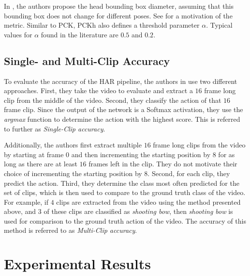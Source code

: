 In \cite{andriluka_2d_2014}, the authors propose the head bounding box diameter, assuming that this bounding box does not change for different poses.
See  for a motivation of the metric.
Similar to PCK, PCKh also defines a threshold parameter $\alpha$.
Typical values for $\alpha$ found in the literature are $0.5$ and $0.2$.

\subsection{Single- and Multi-Clip Accuracy}
To evaluate the accuracy of the HAR pipeline, the authors in \cite{luvizon_2d/3d_2018} use two different approaches.
First, they take the video to evaluate and extract a $16$ frame long clip from the middle of the video.
Second, they classify the action of that $16$ frame clip.
Since the output of the network is a Softmax activation, they use the \textit{argmax} function to determine the action with the highest score.
This is referred to further as \textit{Single-Clip accuracy}.

Additionally, the authors first extract multiple $16$ frame long clips from the video by starting at frame $0$ and then incrementing the starting position by $8$ for as long as there are at least $16$ frames left in the clip.
They do not motivate their choice of incrementing the starting position by $8$.
Second, for each clip, they predict the action.
Third, they determine the class most often predicted for the set of clips, which is then used to compare to the ground truth class of the video.
For example, if $4$ clips are extracted from the video using the method presented above, and $3$ of these clips are classified as \textit{shooting bow}, then \textit{shooting bow} is used for comparison to the ground truth action of the video.
The accuracy of this method is referred to as \textit{Multi-Clip accuracy}.

\section{Experimental Results}
\label{sec:exp-results}
